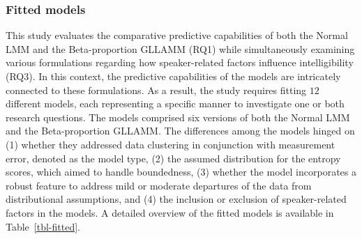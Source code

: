 \documentclass[
sn-apacite
]{sn-jnl}
\begin{document}
\subsubsection{Fitted models}\label{sec-M-SM-FM}

This study evaluates the comparative predictive capabilities of both the
Normal LMM and the Beta-proportion GLLAMM (RQ1) while simultaneously
examining various formulations regarding how speaker-related factors
influence intelligibility (RQ3). In this context, the predictive
capabilities of the models are intricately connected to these
formulations. As a result, the study requires fitting \(12\) different
models, each representing a specific manner to investigate one or both
research questions. The models comprised six versions of both the Normal
LMM and the Beta-proportion GLLAMM. The differences among the models
hinged on (1) whether they addressed data clustering in conjunction with
measurement error, denoted as the model type, (2) the assumed
distribution for the entropy scores, which aimed to handle boundedness,
(3) whether the model incorporates a robust feature to address mild or
moderate departures of the data from distributional assumptions, and (4)
the inclusion or exclusion of speaker-related factors in the models. A
detailed overview of the fitted models is available in
Table~\ref{tbl-fitted}.
\end{document}
